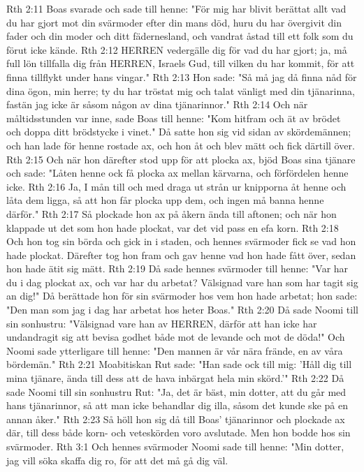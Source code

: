 Rth 2:11  Boas svarade och sade till henne: "För mig har blivit berättat allt vad du har gjort mot din svärmoder efter din mans död, huru du har övergivit din fader och din moder och ditt fädernesland, och vandrat åstad till ett folk som du förut icke kände.
Rth 2:12  HERREN vedergälle dig för vad du har gjort; ja, må full lön tillfalla dig från HERREN, Israels Gud, till vilken du har kommit, för att finna tillflykt under hans vingar."
Rth 2:13  Hon sade: "Så må jag då finna nåd för dina ögon, min herre; ty du har tröstat mig och talat vänligt med din tjänarinna, fastän jag icke är såsom någon av dina tjänarinnor."
Rth 2:14  Och när måltidsstunden var inne, sade Boas till henne: "Kom hitfram och ät av brödet och doppa ditt brödstycke i vinet." Då satte hon sig vid sidan av skördemännen; och han lade för henne rostade ax, och hon åt och blev mätt och fick därtill över.
Rth 2:15  Och när hon därefter stod upp för att plocka ax, bjöd Boas sina tjänare och sade: "Låten henne ock få plocka ax mellan kärvarna, och förfördelen henne icke.
Rth 2:16  Ja, I mån till och med draga ut strån ur knipporna åt henne och låta dem ligga, så att hon får plocka upp dem, och ingen må banna henne därför."
Rth 2:17  Så plockade hon ax på åkern ända till aftonen; och när hon klappade ut det som hon hade plockat, var det vid pass en efa korn.
Rth 2:18  Och hon tog sin börda och gick in i staden, och hennes svärmoder fick se vad hon hade plockat. Därefter tog hon fram och gav henne vad hon hade fått över, sedan hon hade ätit sig mätt.
Rth 2:19  Då sade hennes svärmoder till henne: "Var har du i dag plockat ax, och var har du arbetat? Välsignad vare han som har tagit sig an dig!" Då berättade hon för sin svärmoder hos vem hon hade arbetat; hon sade: "Den man som jag i dag har arbetat hos heter Boas."
Rth 2:20  Då sade Noomi till sin sonhustru: "Välsignad vare han av HERREN, därför att han icke har undandragit sig att bevisa godhet både mot de levande och mot de döda!" Och Noomi sade ytterligare till henne: "Den mannen är vår nära frände, en av våra bördemän."
Rth 2:21  Moabitiskan Rut sade: "Han sade ock till mig: 'Håll dig till mina tjänare, ända till dess att de hava inbärgat hela min skörd.'"
Rth 2:22  Då sade Noomi till sin sonhustru Rut: "Ja, det är bäst, min dotter, att du går med hans tjänarinnor, så att man icke behandlar dig illa, såsom det kunde ske på en annan åker."
Rth 2:23  Så höll hon sig då till Boas' tjänarinnor och plockade ax där, till dess både korn- och veteskörden voro avslutade. Men hon bodde hos sin svärmoder.
Rth 3:1  Och hennes svärmoder Noomi sade till henne: "Min dotter, jag vill söka skaffa dig ro, för att det må gå dig väl.
